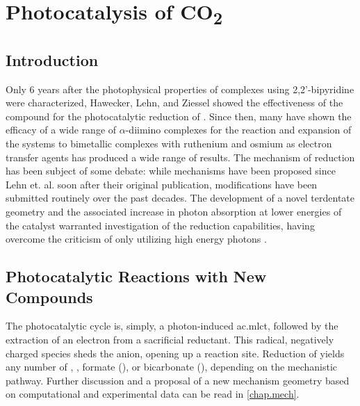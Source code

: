 \chapter{Photocatalysis of \texorpdfstring{CO\textsubscript{2}}{CO2}}\label{chap.co2}

\section{Introduction}

Only 6 years after the photophysical properties of  complexes using 2,2'-bipyridine were characterized\autocite{morse1976}, Hawecker, Lehn, and Ziessel showed the effectiveness of the compound for the photocatalytic reduction of \autocite{hawecker1983}. Since then, many have shown the efficacy of a wide range of $\alpha$-diimino complexes for the reaction\autocite{hawecker1986, kurz2006, portenkirchner2014} and expansion of the systems to bimetallic complexes with ruthenium and osmium as electron transfer agents has produced a wide range of results\autocite{rossenaar1996, takeda2008, tamaki2013}. The mechanism of reduction has been subject of some debate: while mechanisms have been proposed since Lehn et. al. soon after their original publication\autocite{hawecker1986}, modifications have been submitted routinely over the past decades\autocite{hayashi2003, morris2009, takeda2008, grills2010, agarwal2011, agarwal2012a, agarwal2012b, keith2013}. The development of a novel terdentate geometry and the associated increase in photon absorption at lower energies of the catalyst warranted investigation of the  reduction capabilities, having overcome the criticism of only utilizing high energy photons \autocite{kutal1985}. 

\section{Photocatalytic Reactions with New Compounds}

The photocatalytic cycle is, simply, a photon-induced \gls{ac.mlct}, followed by the extraction of an electron from a sacrificial reductant. This radical, negatively charged species sheds the anion, opening up a reaction site. Reduction of  yields any number of , , formate (), or bicarbonate (), depending on the mechanistic pathway. Further discussion and a proposal of a new mechanism geometry based on computational and experimental data can be read in \autoref{chap.mech}.

